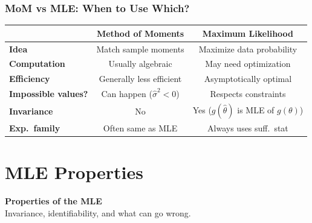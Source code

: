 \documentclass[aspectratio=169]{beamer}
\begin{document}
\begin{frame}
\frametitle{MoM vs MLE: When to Use Which?}
\begin{center}
\small
\renewcommand{\arraystretch}{1.6}
\begin{tabular}{lcc}
  & \textbf{Method of Moments} & \textbf{Maximum Likelihood} \\
  \hline
  \textbf{Idea} & Match sample moments & Maximize data probability \\
  \textbf{Computation} & Usually algebraic & May need optimization \\
  \textbf{Efficiency} & Generally \textcolor{warnred}{less efficient} & \textcolor{paramgreen}{Asymptotically optimal} \\
  \textbf{Impossible values?} & \textcolor{warnred}{Can happen} ($\hat\sigma^2 < 0$) & \textcolor{paramgreen}{Respects constraints} \\
  \textbf{Invariance} & \textcolor{warnred}{No} & \textcolor{paramgreen}{Yes} ($g(\hat\theta)$ is MLE of $g(\theta)$) \\
  \textbf{Exp.\ family} & Often \textcolor{paramgreen}{same as MLE} & Always uses suff.\ stat \\
  \hline
\end{tabular}
\end{center}

\vspace{0.3cm}
\begin{center}
\end{center}
\end{frame}

\section{MLE Properties}

\begin{frame}
\begin{center}
  \vspace{1.5cm}
  {\Huge\bfseries\textcolor{popblue}{Properties of the MLE}}\\[12pt]
  {\large Invariance, identifiability, and what can go wrong.}
\end{center}
\end{frame}
\end{document}

